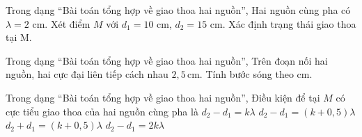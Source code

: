 \begin{ex}
Trong dạng “Bài toán tổng hợp về giao thoa hai nguồn”, Hai nguồn cùng pha có $\lambda=2$ cm. Xét điểm $M$ với $d_1=10$ cm, $d_2=15$ cm. Xác định trạng thái giao thoa tại M.
\choiceTF

\end{ex}

\begin{ex}
Trong dạng “Bài toán tổng hợp về giao thoa hai nguồn”, Trên đoạn nối hai nguồn, hai cực đại liên tiếp cách nhau $2,5\,\text{cm}$. Tính bước sóng theo cm.
\end{ex}

\begin{ex}
Trong dạng “Bài toán tổng hợp về giao thoa hai nguồn”, Điều kiện để tại $M$ có cực tiểu giao thoa của hai nguồn cùng pha là
\choice
{$d_2-d_1=k\lambda$}
{\True $d_2-d_1=(k+0,5)\lambda$}
{$d_2+d_1=(k+0,5)\lambda$}
{$d_2-d_1=2k\lambda$}
\end{ex}

